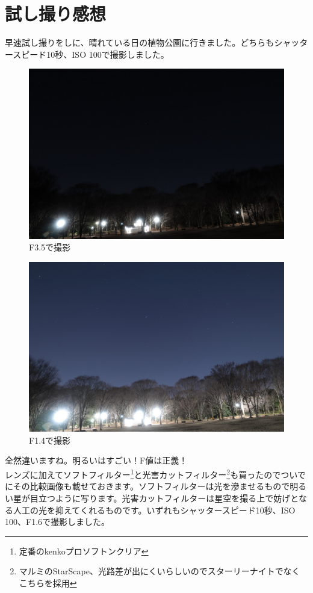 \documentclass[a4paper.10pt]{jarticle}
\begin{document}
\section{試し撮り感想}
早速試し撮りをしに、晴れている日の植物公園に行きました。どちらもシャッタースピード10秒、ISO 100で撮影しました。
\begin{figure}[H]
\begin{center}
  \includegraphics[width=12cm]{kurai.jpg}
\caption{F3.5で撮影}
\label{}
\end{center}
\end{figure}
\begin{figure}[H]
\begin{center}
  \includegraphics[width=12cm]{akarui.jpg}
\caption{F1.4で撮影}
\label{}
\end{center}
\end{figure}
全然違いますね。明るいはすごい！F値は正義！\\
レンズに加えてソフトフィルター\footnote{定番のkenkoプロソフトンクリア}と光害カットフィルター\footnote{マルミのStarScape、光路差が出にくいらしいのでスターリーナイトでなくこちらを採用}も買ったのでついでにその比較画像も載せておきます。ソフトフィルターは光を滲ませるもので明るい星が目立つように写ります。光害カットフィルターは星空を撮る上で妨げとなる人工の光を抑えてくれるものです。いずれもシャッタースピード10秒、ISO 100、F1.6で撮影しました。
\end{document}

